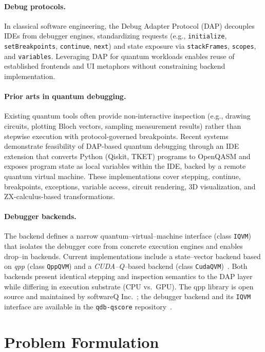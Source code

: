 \documentclass[12pt]{article}
\begin{document}
\paragraph{Debug protocols.}
In classical software engineering, the Debug Adapter Protocol (DAP) decouples IDEs from debugger engines, standardizing requests (e.g., \texttt{initialize}, \texttt{setBreakpoints}, \texttt{continue}, \texttt{next}) and state exposure via \texttt{stackFrames}, \texttt{scopes}, and \texttt{variables}. Leveraging DAP for quantum workloads enables reuse of established frontends and UI metaphors without constraining backend implementation.

\paragraph{Prior arts in quantum debugging.}
Existing quantum tools often provide non-interactive inspection (e.g., drawing circuits, plotting Bloch vectors, sampling measurement results) rather than stepwise execution with protocol-governed breakpoints. Recent systems demonstrate feasibility of DAP-based quantum debugging through an IDE extension that converts Python (Qiskit, TKET) programs to OpenQASM and exposes program state as local variables within the IDE, backed by a remote quantum virtual machine. These implementations cover stepping, continue, breakpoints, exceptions, variable access, circuit rendering, 3D visualization, and ZX-calculus-based transformations.

\paragraph{Debugger backends.}
The backend defines a narrow quantum--virtual--machine interface (class \texttt{IQVM}) that isolates the debugger core from concrete execution engines and enables drop--in backends. Current implementations include a state--vector backend based on \emph{qpp} (class \texttt{QppQVM}) and a \emph{CUDA--Q}--based backend (class \texttt{CudaQVM})~\cite{cudaq-github}. Both backends present identical stepping and inspection semantics to the DAP layer while differing in execution substrate (CPU vs.\ GPU). The qpp library is open source and maintained by softwareQ Inc.~\cite{qpp}; the debugger backend and its \texttt{IQVM} interface are available in the \texttt{qdb-qscore} repository~\cite{qdb-qscore}.




\section{Problem Formulation}
\label{sec:problem}
\end{document}
